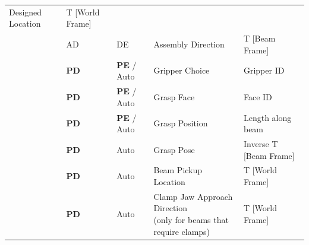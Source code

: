 \documentclass[11pt]{book}
\begin{document}
\begin{table}[H]
\begin{adjustbox}{max width=\textwidth}
\begin{tabular}{p{2.09cm}p{1.51cm}p{1.93cm}p{5.92cm}p{4.48cm}}
\multicolumn{1}{|p{5.92cm}}{{\footnotesize Designed Location}} & 
\multicolumn{1}{|p{4.48cm}|}{{\footnotesize T [World Frame]}} \\ 
\hhline{~----}
\multicolumn{1}{|p{2.09cm}}{} & 
\multicolumn{1}{|p{1.51cm}}{{\footnotesize AD}} & 
\multicolumn{1}{|p{1.93cm}}{{\footnotesize DE}} & 
\multicolumn{1}{|p{5.92cm}}{{\footnotesize Assembly Direction}} & 
\multicolumn{1}{|p{4.48cm}|}{{\footnotesize T [Beam Frame]}} \\ 
\hhline{~----}
\multicolumn{1}{|p{2.09cm}}{} & 
\multicolumn{1}{|p{1.51cm}}{{\footnotesize \textbf{PD}}} & 
\multicolumn{1}{|p{1.93cm}}{{\footnotesize \textbf{PE }/ Auto}} & 
\multicolumn{1}{|p{5.92cm}}{{\footnotesize Gripper Choice}} & 
\multicolumn{1}{|p{4.48cm}|}{{\footnotesize Gripper ID}} \\ 
\hhline{~----}
\multicolumn{1}{|p{2.09cm}}{} & 
\multicolumn{1}{|p{1.51cm}}{{\footnotesize \textbf{PD}}} & 
\multicolumn{1}{|p{1.93cm}}{{\footnotesize \textbf{PE }/ Auto}} & 
\multicolumn{1}{|p{5.92cm}}{{\footnotesize Grasp Face}} & 
\multicolumn{1}{|p{4.48cm}|}{{\footnotesize Face ID}} \\ 
\hhline{~----}
\multicolumn{1}{|p{2.09cm}}{} & 
\multicolumn{1}{|p{1.51cm}}{{\footnotesize \textbf{PD}}} & 
\multicolumn{1}{|p{1.93cm}}{{\footnotesize \textbf{PE }/ Auto}} & 
\multicolumn{1}{|p{5.92cm}}{{\footnotesize Grasp Position}} & 
\multicolumn{1}{|p{4.48cm}|}{{\footnotesize Length along beam}} \\ 
\hhline{~----}
\multicolumn{1}{|p{2.09cm}}{} & 
\multicolumn{1}{|p{1.51cm}}{{\footnotesize \textbf{PD}}} & 
\multicolumn{1}{|p{1.93cm}}{{\footnotesize Auto}} & 
\multicolumn{1}{|p{5.92cm}}{{\footnotesize Grasp Pose}} & 
\multicolumn{1}{|p{4.48cm}|}{{\footnotesize Inverse T [Beam Frame]}} \\ 
\hhline{~----}
\multicolumn{1}{|p{2.09cm}}{} & 
\multicolumn{1}{|p{1.51cm}}{{\footnotesize \textbf{PD}}} & 
\multicolumn{1}{|p{1.93cm}}{{\footnotesize Auto}} & 
\multicolumn{1}{|p{5.92cm}}{{\footnotesize Beam Pickup Location}} & 
\multicolumn{1}{|p{4.48cm}|}{{\footnotesize T [World Frame]}} \\ 
\hhline{~----}
\multicolumn{1}{|p{2.09cm}}{} & 
\multicolumn{1}{|p{1.51cm}}{{\footnotesize \textbf{PD}}} & 
\multicolumn{1}{|p{1.93cm}}{{\footnotesize Auto}} & 
\multicolumn{1}{|p{5.92cm}}{{\footnotesize Clamp Jaw Approach Direction} \newline
{\scriptsize (only for beams that require clamps)}} & 
\multicolumn{1}{|p{4.48cm}|}{{\footnotesize T [World Frame]}} \\ 

\end{tabular}
\end{adjustbox}
\end{table}
\end{document}
